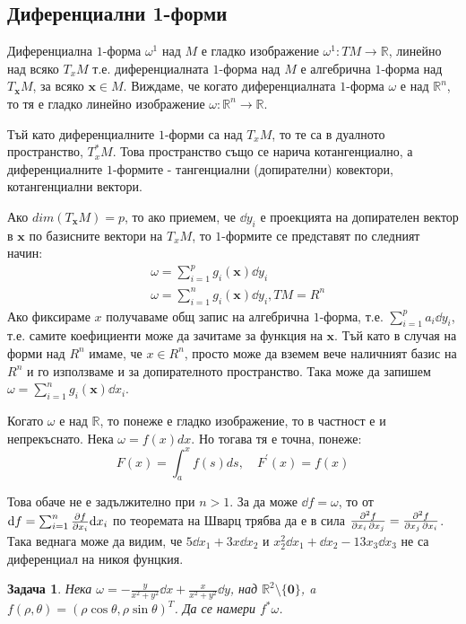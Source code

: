 \documentclass[12pt]{article}
\newtheorem{problem}{Задача}
\newcommand\func[3]{#1:#2 \to #3}
\newcommand\stfunc[1]{\func{#1}{\mathbb{R}^n}{\mathbb{R}}}
\begin{document}
\begin{large}
\subsection{Диференциални 1-форми}
Диференциална $1$-форма $\omega^1$ над $M$ е гладко изображение $\func{\omega^1}{TM}{\mathbb{R}}$, линейно над всяко $T_xM$ т.е. диференциалната $1$-форма над $M$ е алгебрична $1$-форма над $T_{\mathbf{x}}M$, за всяко ${\mathbf{x}} \in M$.
Виждаме, че когато диференциалната $1$-форма $\omega$ е над $\mathbb{R}^n$, то тя е гладко линейно изображение $\stfunc{\omega}$.

Тъй като диференциалните $1$-форми са над $T_x M$, то те са в дуалното пространство, $T_x^* M$. Това пространство също се нарича котангенциално, а диференциалните $1$-формите - тангенциални (допирателни) ковектори, котангенциални вектори.

Ако $dim(T_{\mathbf{x}}M)=p$, то ако приемем, че $\dd y_i$ е проекцията на допирателен вектор в ${\mathbf{x}}$ по базисните вектори на $T_xM$, то $1$-формите се представят по следният начин:
\begin{align*}
&\omega = \sum_{i=1}^{p}g_i(\mathbf{x}) \dd y_i \\
&\omega = \sum_{i=1}^{n}g_i(\mathbf{x}) \dd y_i, TM=R^n
\end{align*}
Ако фиксираме $x$ получаваме общ запис на алгебрична $1$-форма, т.е. $\sum_{i=1}^{p}a_i \dd y_i$, т.е. самите коефициенти може да зачитаме за функция на ${\mathbf{x}}$. Тъй като в случая на форми над $R^n$ имаме, че $x \in R^n$, просто може да вземем вече наличният базис на $R^n$ и го използваме и за допирателното пространство. Така може да запишем $\omega = \sum_{i=1}^{n}g_i(\mathbf{x}) \dd x_i$.


Когато $\omega$ е над $\mathbb{R}$, то понеже е гладко изображение, то в частност е и непрекъснато. Нека $\omega=f(x)dx$. Но тогава тя е точна, понеже: 
\[
F(x)=\int_{a}^{x}f(s)ds,\quad F^\prime(x)=f(x)
\]

Това обаче не е задължително при $n>1$. За да може $\dd f=\omega$, то от $\dd f= \sum_{i=1}^{n}\pdv{f}{x_i}\dd x_i$ по теоремата на Шварц трябва да е в сила $\pdv{f}{x_i,x_j}=\pdv{f}{x_j,x_i}$. Така веднага може да видим, че $5\dd x_1 + 3x \dd x_2$ и $x_2^2 \dd x_1 + \dd x_2 - 13x_3 \dd x_3$ не са диференциал на никоя фунцкия.

\begin{problem}
Нека $\omega = - \frac{y}{x^2+y^2} \dd x + \frac{x}{x^2+y^2} \dd y$, над $\mathbb{R}^2 \setminus \{\mathbf{0}\}$, a $f(\rho,\theta)=(\rho \cos \theta,\rho \sin \theta)^T$. Да се намери $f^* \omega$.
\end{problem}


\end{large}
\end{document}
